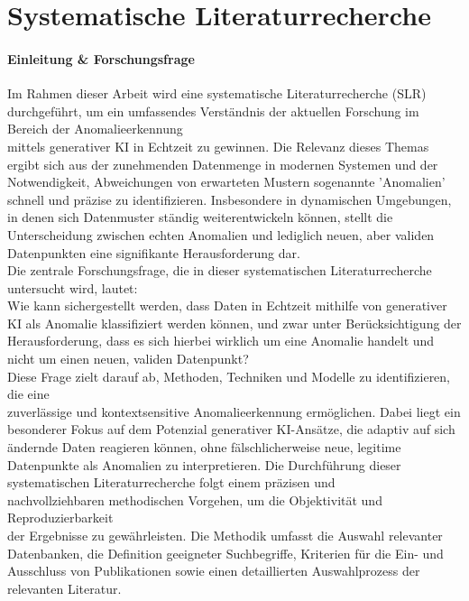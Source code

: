 \chapter{Systematische Literaturrecherche}
\label{ch:bsp}
\subsubsection{Einleitung \& Forschungsfrage} 
Im Rahmen dieser Arbeit wird eine systematische Literaturrecherche (SLR) durchgeführt, um ein umfassendes Verständnis der aktuellen Forschung im Bereich der Anomalieerkennung \\ mittels generativer KI in Echtzeit zu gewinnen. Die Relevanz dieses Themas ergibt sich aus der zunehmenden Datenmenge in modernen Systemen und der Notwendigkeit, Abweichungen von erwarteten Mustern sogenannte 'Anomalien' schnell und präzise zu identifizieren. Insbesondere in dynamischen Umgebungen, in denen sich Datenmuster ständig weiterentwickeln können, stellt die Unterscheidung zwischen echten Anomalien und lediglich neuen, aber validen Datenpunkten eine signifikante Herausforderung dar.
\\
Die zentrale Forschungsfrage, die in dieser systematischen Literaturrecherche untersucht wird, lautet:
\\
Wie kann sichergestellt werden, dass Daten in Echtzeit mithilfe von generativer KI als Anomalie klassifiziert werden können, und zwar unter Berücksichtigung der Herausforderung, dass es sich hierbei wirklich um eine Anomalie handelt und nicht um einen neuen, validen Datenpunkt?
\\
Diese Frage zielt darauf ab, Methoden, Techniken und Modelle zu identifizieren, die eine \\ zuverlässige und kontextsensitive Anomalieerkennung ermöglichen. Dabei liegt ein besonderer Fokus auf dem Potenzial generativer KI-Ansätze, die adaptiv auf sich ändernde Daten reagieren können, ohne fälschlicherweise neue, legitime Datenpunkte als Anomalien zu interpretieren.
\nAbsatz
Die Durchführung dieser systematischen Literaturrecherche folgt einem präzisen und \\ nachvollziehbaren methodischen Vorgehen, um die Objektivität und Reproduzierbarkeit \\ der Ergebnisse zu gewährleisten. Die Methodik umfasst die Auswahl relevanter Datenbanken, die Definition geeigneter Suchbegriffe, Kriterien für die Ein- und Ausschluss von Publikationen sowie einen detaillierten Auswahlprozess der relevanten Literatur.
